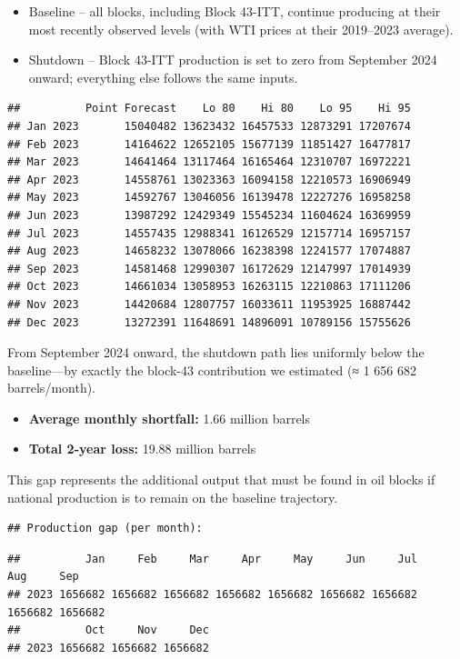 \documentclass[
]{article}
\begin{document}
\begin{itemize}
\item
  Baseline -- all blocks, including Block 43-ITT, continue producing at
  their most recently observed levels (with WTI prices at their
  2019--2023 average).
\item
  Shutdown -- Block 43-ITT production is set to zero from September 2024
  onward; everything else follows the same inputs.
\end{itemize}

\begin{verbatim}
##          Point Forecast    Lo 80    Hi 80    Lo 95    Hi 95
## Jan 2023       15040482 13623432 16457533 12873291 17207674
## Feb 2023       14164622 12652105 15677139 11851427 16477817
## Mar 2023       14641464 13117464 16165464 12310707 16972221
## Apr 2023       14558761 13023363 16094158 12210573 16906949
## May 2023       14592767 13046056 16139478 12227276 16958258
## Jun 2023       13987292 12429349 15545234 11604624 16369959
## Jul 2023       14557435 12988341 16126529 12157714 16957157
## Aug 2023       14658232 13078066 16238398 12241577 17074887
## Sep 2023       14581468 12990307 16172629 12147997 17014939
## Oct 2023       14661034 13058953 16263115 12210863 17111206
## Nov 2023       14420684 12807757 16033611 11953925 16887442
## Dec 2023       13272391 11648691 14896091 10789156 15755626
\end{verbatim}

From September 2024 onward, the shutdown path lies uniformly below the
baseline---by exactly the block-43 contribution we estimated (≈ 1 656
682 barrels/month).

\begin{itemize}
\item
  \textbf{Average monthly shortfall:} 1.66 million barrels
\item
  \textbf{Total 2-year loss:} 19.88 million barrels
\end{itemize}

This gap represents the additional output that must be found in oil
blocks if national production is to remain on the baseline trajectory.

\begin{verbatim}
## Production gap (per month):
\end{verbatim}

\begin{verbatim}
##          Jan     Feb     Mar     Apr     May     Jun     Jul     Aug     Sep
## 2023 1656682 1656682 1656682 1656682 1656682 1656682 1656682 1656682 1656682
##          Oct     Nov     Dec
## 2023 1656682 1656682 1656682
\end{verbatim}
\end{document}
